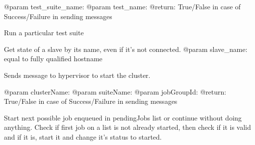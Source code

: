 \documentclass[a4paper,11pt,openany]{sphinxmanual}
\begin{document}
\begin{fulllineitems}
\begin{fulllineitems}
@param test\_suite\_name:
@param test\_name:
@return: True/False in case of Success/Failure in sending messages

\end{fulllineitems}


\begin{fulllineitems}
\label{ref-manual/XrdTestMaster:XrdTestMaster.XrdTestMaster.runTestSuite}
Run a particular test suite

\end{fulllineitems}


\begin{fulllineitems}
\label{ref-manual/XrdTestMaster:XrdTestMaster.XrdTestMaster.selectHypervisor}
\end{fulllineitems}


\begin{fulllineitems}
\label{ref-manual/XrdTestMaster:XrdTestMaster.XrdTestMaster.slaveState}
Get state of a slave by its name, even if it's not connected.
@param slave\_name: equal to fully qualified hostname

\end{fulllineitems}


\begin{fulllineitems}
\label{ref-manual/XrdTestMaster:XrdTestMaster.XrdTestMaster.startCluster}
Sends message to hypervisor to start the cluster.

@param clusterName:
@param suiteName:
@param jobGroupId:
@return: True/False in case of Success/Failure in sending messages

\end{fulllineitems}


\begin{fulllineitems}
\label{ref-manual/XrdTestMaster:XrdTestMaster.XrdTestMaster.startNextJob}
Start next possible job enqueued in pendingJobs list or continue
without doing anything. Check if first job on a list is not already
started, then check if it is valid and if it is, start it and change
it's status to started.


\end{fulllineitems}
\end{fulllineitems}
\end{document}

